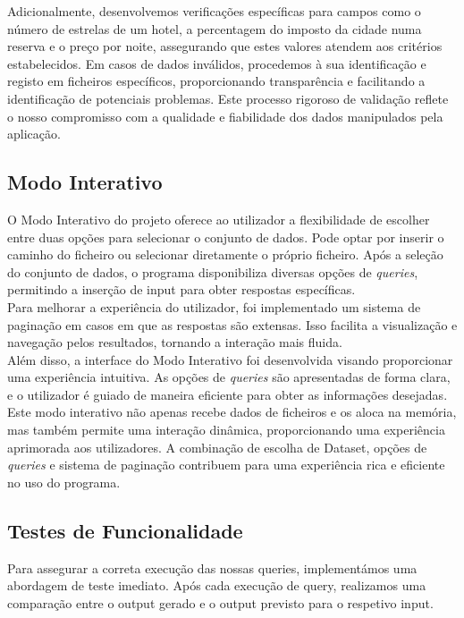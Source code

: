 \documentclass[12pt,a4paper]{article}
\begin{document}
    Adicionalmente, desenvolvemos verificações específicas para campos como o número de estrelas de um hotel, a percentagem do imposto da cidade numa reserva e o preço por noite, assegurando que estes valores atendem aos critérios estabelecidos. Em casos de dados inválidos, procedemos à sua identificação e registo em ficheiros específicos, proporcionando transparência e facilitando a identificação de potenciais problemas. Este processo rigoroso de validação reflete o nosso compromisso com a qualidade e fiabilidade dos dados manipulados pela aplicação.
    
    \subsection{Modo Interativo}
    \hspace{0,6cm}O Modo Interativo do projeto oferece ao utilizador a flexibilidade de escolher entre duas opções para selecionar o conjunto de dados. Pode optar por inserir o caminho do ficheiro ou selecionar diretamente o próprio ficheiro. Após a seleção do conjunto de dados, o programa disponibiliza diversas opções de \textit{queries}, permitindo a inserção de input para obter respostas específicas.\\

    Para melhorar a experiência do utilizador, foi implementado um sistema de paginação em casos em que as respostas são extensas. Isso facilita a visualização e navegação pelos resultados, tornando a interação mais fluida.\\

    Além disso, a interface do Modo Interativo foi desenvolvida visando proporcionar uma experiência intuitiva. As opções de \textit{queries} são apresentadas de forma clara, e o utilizador é guiado de maneira eficiente para obter as informações desejadas.\\

    Este modo interativo não apenas recebe dados de ficheiros e os aloca na memória, mas também permite uma interação dinâmica, proporcionando uma experiência aprimorada aos utilizadores. A combinação de escolha de Dataset, opções de \textit{queries} e sistema de paginação contribuem para uma experiência rica e eficiente no uso do programa.

    \subsection{Testes de Funcionalidade}
    \hspace{0,6cm} Para assegurar a correta execução das nossas queries, implementámos uma abordagem de teste imediato. Após cada execução de query, realizamos uma comparação entre o output gerado e o output previsto para o respetivo input. \\
\end{document}
